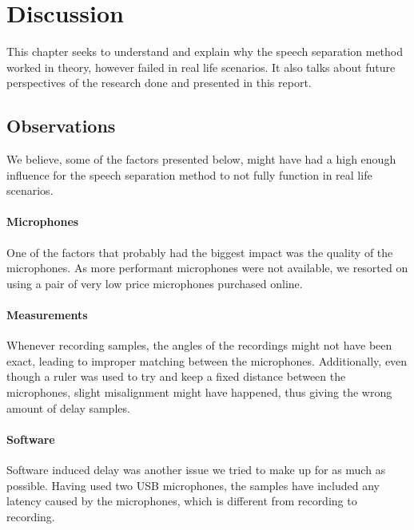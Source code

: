 \chapter{Discussion}\label{ch:discussion}
This chapter seeks to understand and explain why the speech separation method worked in theory,
however failed in real life scenarios.
It also talks about future perspectives of the research done and presented in this report.
\section{Observations}
We believe, some of the factors presented below, might have had a high enough influence for the speech 
separation method to not fully function in real life scenarios.
\subsubsection{Microphones}
One of the factors that probably had the biggest impact was the quality of the microphones. As more
performant microphones were not available, we resorted on using a pair of very low price microphones
purchased online.
\subsubsection{Measurements}
Whenever recording samples, the angles of the recordings might not have been exact, leading to improper 
matching between the microphones. Additionally, even though a ruler was used to try and keep a fixed 
distance between the microphones, slight misalignment might have happened, thus giving the wrong
amount of delay samples.
\subsubsection{Software}
Software induced delay was another issue we tried to make up for as much as possible. Having used two USB 
microphones, the samples have included any latency caused by the microphones, which is different from 
recording to recording.\cite{USBLATENCY}